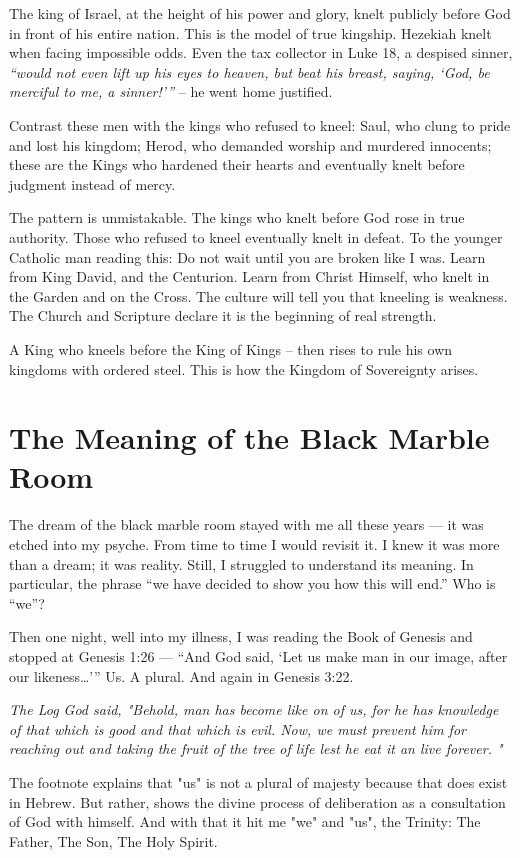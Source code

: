 \documentclass[12pt,a4paper]{book}
\begin{document}
The king of Israel, at the height of his power and glory, knelt publicly before God in front of his entire nation. This is the model of true kingship.  Hezekiah knelt when facing impossible odds.  Even the tax collector in Luke 18, a despised sinner, \textit{“would not even lift up his eyes to heaven, but beat his breast, saying, ‘God, be merciful to me, a sinner!’”} -- he went home justified.

Contrast these men with the kings who refused to kneel: Saul, who clung to pride and lost his kingdom; Herod, who demanded worship and murdered innocents; these are the Kings who hardened their hearts and eventually knelt before judgment instead of mercy.

The pattern is unmistakable.  The kings who knelt before God rose in true authority.  Those who refused to kneel eventually knelt in defeat.  To the younger Catholic man reading this: Do not wait until you are broken like I was.  Learn from King David, and the Centurion.  Learn from Christ Himself, who knelt in the Garden and on the Cross. The culture will tell you that kneeling is weakness. The Church and Scripture declare it is the beginning of real strength.

A King who kneels before the King of Kings -- then rises to rule his own kingdoms with ordered steel.  This is how the Kingdom of Sovereignty arises.

\section{The Meaning of the Black Marble Room}

The dream of the black marble room stayed with me all these years — it was etched into my psyche. From time to time I would revisit it. I knew it was more than a dream; it was reality. Still, I struggled to understand its meaning. In particular, the phrase “we have decided to show you how this will end.” Who is “we”?

Then one night, well into my illness, I was reading the Book of Genesis and stopped at Genesis 1:26 — “And God said, ‘Let us make man in our image, after our likeness…’” Us.  A plural.  And again in Genesis 3:22. 

\textit{The Log God said, "Behold, man has become like on of us, for he has knowledge of that which is good and that which is evil.  Now, we must prevent him for reaching out and taking the fruit of the tree of life lest he eat it an live forever. "}


The footnote  explains that "us" is not a plural of majesty because that does exist in Hebrew.  But rather, shows the divine process of deliberation as a consultation of God with himself.  And with that it hit me "we" and "us", the Trinity: The Father, The Son, The Holy Spirit.
\end{document}
